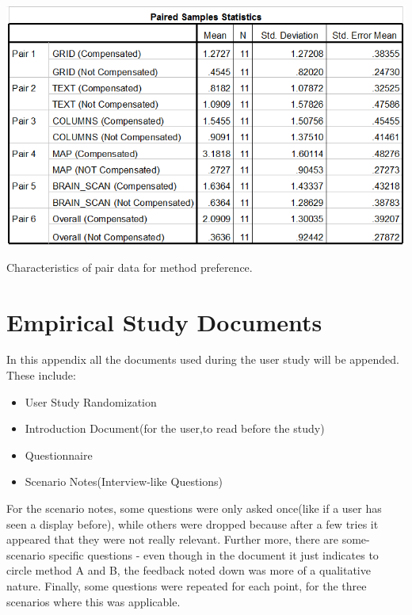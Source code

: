 \documentclass[]{article}
\begin{document}
\begin{appendices}
\begin{table}[!h]
  \includegraphics[width=\linewidth]{figures/results/Preference_Pairs.PNG}
  \caption{Characteristics of pair data for method preference.}
  \label{tabel:Preference_Pairs}
\end{table}

\clearpage{\pagestyle{empty}\cleardoublepage}

\section{Empirical Study Documents}
\label{appendix:C}
In this appendix all the documents used during the user study will be appended. These include:
\begin{itemize}
   \item User Study Randomization
   \item Introduction Document(for the user,to read before the study)
   \item Questionnaire
   \item Scenario Notes(Interview-like Questions)
\end{itemize}

For the scenario notes, some questions were only asked once(like if a user has seen a display before), while others were dropped because after a few tries it appeared that they were not really relevant. Further more, there are some-scenario specific questions - even though in the document it just indicates to circle method A and B, the feedback noted down was more of a qualitative nature. Finally, some questions were repeated for each point, for the three scenarios where this was applicable.





\clearpage{\pagestyle{empty}\cleardoublepage}
\end{appendices}
\end{document}
